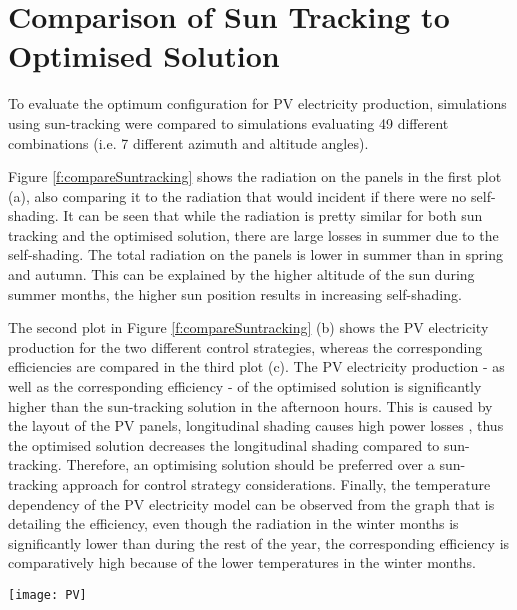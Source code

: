 \section{Comparison of Sun Tracking to Optimised Solution}
\label{s:compareSunTracking}

	To evaluate the optimum configuration for PV electricity production, simulations using sun-tracking were compared to simulations evaluating 49 different combinations (i.e. 7 different azimuth and altitude angles). 

	Figure \ref{f:compareSuntracking} shows the radiation on the panels in the first plot (a), also comparing it to the radiation that would incident if there were no self-shading. It can be seen that while the radiation is pretty similar for both sun tracking and the optimised solution, there are large losses in summer due to the self-shading. The total radiation on the panels is lower in summer than in spring and autumn. This can be explained by the higher altitude of the sun during summer months, the higher sun position results in increasing self-shading. 

	The second plot in Figure \ref{f:compareSuntracking} (b) shows the PV electricity production for the two different control strategies, whereas the corresponding efficiencies are compared in the third plot (c). The PV electricity production - as well as the corresponding efficiency - of the optimised solution is significantly higher than the sun-tracking solution in the afternoon hours. This is caused by the layout of the PV panels, longitudinal shading causes high power losses \cite{hofer2015PVSEC}, thus the optimised solution decreases the longitudinal shading compared to sun-tracking. Therefore, an optimising solution should be preferred over a sun-tracking approach for control strategy considerations. Finally, the temperature dependency of the PV electricity model can be observed from the graph that is detailing the efficiency, even though the radiation in the winter months is significantly lower than during the rest of the year, the corresponding efficiency is comparatively high because of the lower temperatures in the winter months. 

	\begin{figure*}
		\begin{center}
		\texttt{[image: PV]}
		\caption{Comparison of optimised solution to sun-tracking. a) Average radiation on panels compared to radiation without shading. While the radiation for sun-tracking is very similar to the radiation with the optimised angles, there are large losses caused by self-shading on the panels. b) PV electricity production comparison. The optimised solution yields a significantly larger power output. c) PV efficiency comparison. The optimised solution is able to stay at higher efficiencies than the sun-tracking approach.}
		\label{f:compareSuntracking}
		\end{center}
	\end{figure*}



